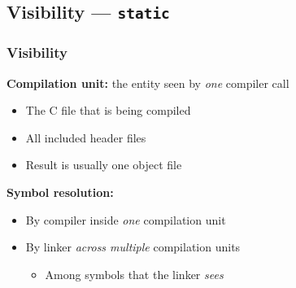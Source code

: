 \subsection{Visibility --- \texttt{static}}

\begin{frame}
  \frametitle{Visibility}

  \textbf{Compilation unit:} the entity seen by \textit{one} compiler
  call

  \begin{itemize}
  \item The C file that is being compiled
  \item All included header files
  \item Result is usually one object file
  \end{itemize}

  \textbf{Symbol resolution: }

  \begin{itemize}
  \item By compiler inside \textit{one} compilation unit
  \item By linker \textit{across multiple} compilation units
    \begin{itemize}
    \item Among symbols that the linker \textit{sees}
    \end{itemize}
  \end{itemize}

\end{frame}

